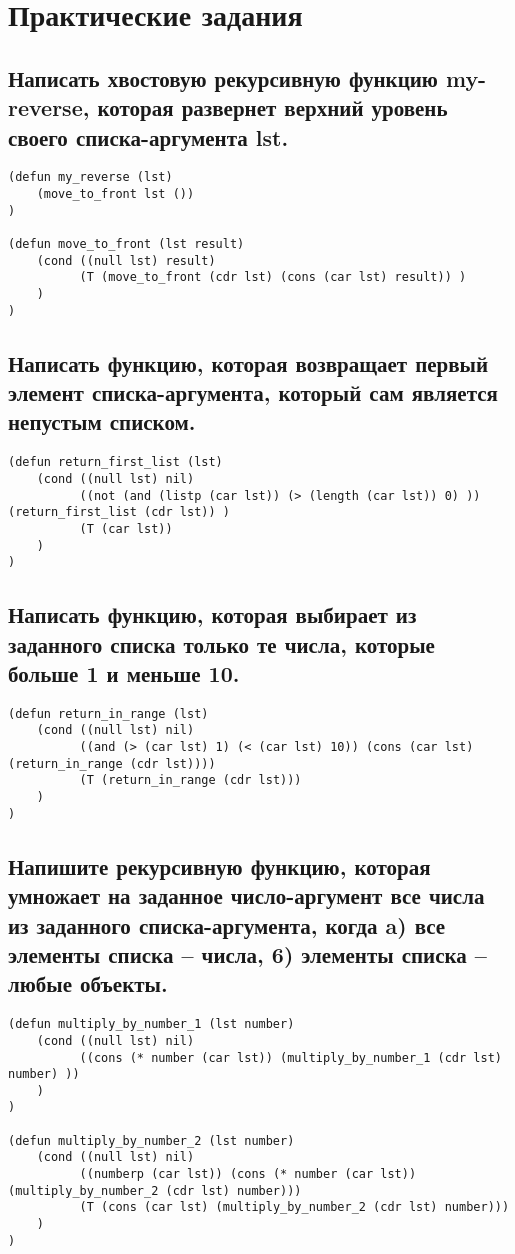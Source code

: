 \chapter{Практические задания}
\section{Написать хвостовую рекурсивную функцию my-reverse, которая развернет верхний уровень своего списка-аргумента lst.}

\begin{lstlisting}[basicstyle=\footnotesize, caption={Задание 1}]
(defun my_reverse (lst)
	(move_to_front lst ())
)

(defun move_to_front (lst result)
	(cond ((null lst) result)
		  (T (move_to_front (cdr lst) (cons (car lst) result)) )
	)
)
\end{lstlisting}

\section{Написать функцию, которая возвращает первый элемент списка-аргумента, который сам является непустым списком.}
\begin{lstlisting}[basicstyle=\footnotesize, caption={Задание 2}]
(defun return_first_list (lst)
	(cond ((null lst) nil) 
		  ((not (and (listp (car lst)) (> (length (car lst)) 0) )) (return_first_list (cdr lst)) )
		  (T (car lst))
	)
)
\end{lstlisting}

\newpage
\section{Написать функцию, которая выбирает из заданного списка только те числа, которые больше 1 и меньше 10.}
\begin{lstlisting}[basicstyle=\footnotesize, caption=Задание 3]
(defun return_in_range (lst)
	(cond ((null lst) nil)
		  ((and (> (car lst) 1) (< (car lst) 10)) (cons (car lst) (return_in_range (cdr lst))))
		  (T (return_in_range (cdr lst)))
	)
)
\end{lstlisting}

\section{Напишите рекурсивную функцию, которая умножает на заданное число-аргумент все числа из заданного списка-аргумента, когда a) все элементы списка -- числа, 6) элементы списка -- любые объекты.}
\begin{lstlisting}[basicstyle=\footnotesize, caption=Задание 4]
(defun multiply_by_number_1 (lst number)
	(cond ((null lst) nil)
		  ((cons (* number (car lst)) (multiply_by_number_1 (cdr lst) number) ))
	)
)

(defun multiply_by_number_2 (lst number)
	(cond ((null lst) nil)
		  ((numberp (car lst)) (cons (* number (car lst)) (multiply_by_number_2 (cdr lst) number)))
		  (T (cons (car lst) (multiply_by_number_2 (cdr lst) number)))
	)
)
\end{lstlisting}

